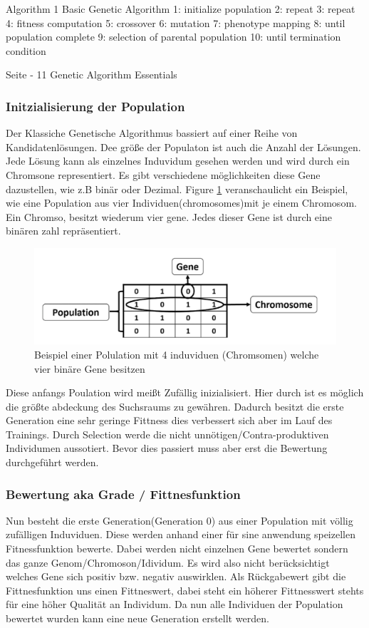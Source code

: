 Algorithm 1 Basic Genetic Algorithm
1: initialize population
2: repeat
3: 		repeat
4:			fitness computation
5:			crossover
6:			mutation
7:			phenotype mapping
8:		until population complete
9:		selection of parental population
10: until termination condition

Seite - 11 Genetic Algorithm Essentials
\fi 

\subsubsection{Initzialisierung der Population}
Der Klassiche Genetische Algorithmus bassiert auf einer Reihe von Kandidatenlösungen. Dee größe der Populaton ist auch die Anzahl der Lösungen. Jede Lösung kann als einzelnes Induvidum gesehen werden und wird durch ein Chromsone representiert. Es gibt verschiedene möglichkeiten diese Gene dazustellen, wie z.B binär oder Dezimal.
Figure \ref{fig:chromosome} veranschaulicht ein Beispiel, wie eine Population aus vier Individuen(chromosomes)mit je einem Chromosom. Ein Chromso, besitzt wiederum  vier gene. Jedes dieser Gene ist durch eine binären zahl repräsentiert. 

\noindent%
\begin{figure}[H]
  \centering  
  \includegraphics[scale=0.3]{img/Chromsome-s134-PracticalComputerVion.png}
  \caption{Beispiel einer Polulation mit 4 induviduen (Chromsomen) welche vier binäre Gene besitzen \cite{Rashid2017} }
  \label{fig:chromosome}
\end{figure}

Diese anfangs Poulation wird meißt Zufällig inizialisiert. Hier durch ist es möglich die größte abdeckung des Suchsraums zu gewähren. Dadurch besitzt die erste Generation eine sehr geringe Fittness dies verbessert sich aber im Lauf des Trainings. Durch Selection werde die nicht unnötigen/Contra-produktiven Individumen aussotiert. Bevor dies passiert muss aber erst die Bewertung durchgeführt werden.


\subsubsection{Bewertung aka Grade / Fittnesfunktion}
Nun besteht die erste Generation(Generation 0) aus einer Population mit völlig zufälligen Induviduen. Diese werden anhand einer für sine anwendung speizellen Fitnessfunktion bewerte. Dabei werden nicht einzelnen Gene bewertet sondern das ganze Genom/Chromoson/Idividum. Es wird also nicht berücksichtigt welches Gene sich positiv bzw. negativ auswirklen. Als Rückgabewert gibt die Fittnesfunktion uns einen Fittneswert, dabei steht ein höherer Fittnesswert stehts für eine höher Qualität an Individum. Da nun alle Individuen der Population bewertet wurden kann eine neue Generation erstellt werden.


